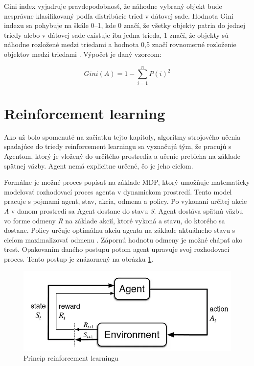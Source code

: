 \documentclass[slovak, master]{diploma}
\begin{document}
Gini index vyjadruje pravdepodobnosť, že náhodne vybraný objekt bude nesprávne klasifikovaný podľa distribúcie tried v dátovej sade. Hodnota Gini indexu sa pohybuje na škále 0--1, kde 0 značí, že všetky objekty patria do jednej triedy alebo v dátovej sade existuje iba jedna trieda, 1 značí, že objekty sú náhodne rozložené medzi triedami a hodnota 0,5 značí rovnomerné rozloženie objektov medzi triedami \cite{Gini}. Výpočet je daný vzorcom:

\[Gini(A) = 1 - \displaystyle\sum\limits_{i=1}^n P(i)^2\]

\section{Reinforcement learning}
\label{sec:ReinfoOverview}
Ako už bolo spomenuté na začiatku tejto kapitoly, algoritmy strojového učenia spadajúce do triedy reinforcement learningu sa vyznačujú tým, že pracujú s Agentom, ktorý je vložený do určitého prostredia a učenie prebieha na základe spätnej väzby. Agent nemá explicitne určené, čo je jeho cieľom. 

Formálne je možné proces popísať na základe MDP, ktorý umožňuje matematicky modelovať rozhodovací proces agenta v dynamickom prostredí. Tento model pracuje s pojmami agent, stav, akcia, odmena a policy. Po vykonaní určitej akcie \textit{A} v danom prostredí sa Agent dostane do stavu \textit{S}. Agent dostáva spätnú väzbu vo forme odmeny \textit{R} na základe akcií, ktoré vykoná a stavu, do ktorého sa dostane. Policy určuje optimálnu akciu agenta na základe aktuálneho stavu s cieľom maximalizovať odmenu \cite{Markov}. Zápornú hodnotu odmeny je možné chápať ako trest. Opakovaním daného postupu potom agent upravuje svoj rozhodovací proces. Tento postup je znázornený na obrázku \ref{pic:reinfoPic}.
  
\begin{figure}[!htbp]
    \centering
    \includegraphics[width=.8\textwidth]{Figures/reinfoGraph.png}
    \caption{Princíp reinforcement learningu \cite{reinfoGraph}}
    \label{pic:reinfoPic}
\end{figure}
\end{document}
